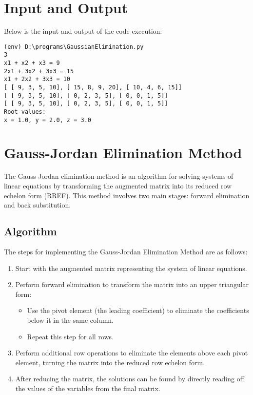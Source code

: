 \documentclass[12pt]{article}
\begin{document}
    \section*{Input and Output}

    \noindent Below is the input and output of the code execution:

    {\small
    \begin{verbatim}
(env) D:\programs\GaussianElimination.py
3
x1 + x2 + x3 = 9
2x1 + 3x2 + 3x3 = 15
x1 + 2x2 + 3x3 = 10
[ [ 9, 3, 5, 10], [ 15, 8, 9, 20], [ 10, 4, 6, 15]]
[ [ 9, 3, 5, 10], [ 0, 2, 3, 5], [ 0, 0, 1, 5]]
[ [ 9, 3, 5, 10], [ 0, 2, 3, 5], [ 0, 0, 1, 5]]
Root values:
x = 1.0, y = 2.0, z = 3.0
    \end{verbatim}
    }
    
    \newpage
    \section*{Gauss-Jordan Elimination Method}

    The Gauss-Jordan elimination method is an algorithm for solving systems of linear equations by transforming the augmented matrix into its reduced row echelon form (RREF). This method involves two main stages: forward elimination and back substitution.
    
    \subsection*{Algorithm}
    The steps for implementing the Gauss-Jordan Elimination Method are as follows:
    
    \begin{enumerate}
        \item Start with the augmented matrix representing the system of linear equations.
        \item Perform forward elimination to transform the matrix into an upper triangular form:
        \begin{itemize}
            \item Use the pivot element (the leading coefficient) to eliminate the coefficients below it in the same column.
            \item Repeat this step for all rows.
        \end{itemize}
        \item Perform additional row operations to eliminate the elements above each pivot element, turning the matrix into the reduced row echelon form.
        \item After reducing the matrix, the solutions can be found by directly reading off the values of the variables from the final matrix.
    \end{enumerate}
    
\end{document}
